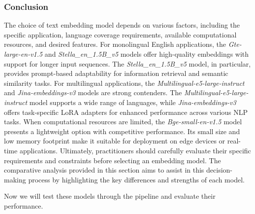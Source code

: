 \subsubsection{Conclusion}
The choice of text embedding model depends on various factors, including the specific application, language coverage requirements, available computational resources, and desired features. For monolingual English applications, the \textit{Gte-large-en-v1.5} and \textit{Stella\_en\_1.5B\_v5} models offer high-quality embeddings with support for longer input sequences.
The \textit{Stella\_en\_1.5B\_v5} model, in particular, provides prompt-based adaptability for information retrieval and semantic similarity tasks.
For multilingual applications, the \textit{Multilingual-e5-large-instruct} and \textit{Jina-embeddings-v3} models are strong contenders.
The \textit{Multilingual-e5-large-instruct} model supports a wide range of languages, while \textit{Jina-embeddings-v3} offers task-specific LoRA adapters for enhanced performance across various NLP tasks.
When computational resources are limited, the \textit{Bge-small-en-v1.5} model presents a lightweight option with competitive performance.
Its small size and low memory footprint make it suitable for deployment on edge devices or real-time applications.
Ultimately, practitioners should carefully evaluate their specific requirements and constraints before selecting an embedding model.
The comparative analysis provided in this section aims to assist in this decision-making process by highlighting the key differences and strengths of each model.

Now we will test these models through the pipeline and evaluate their performance.

